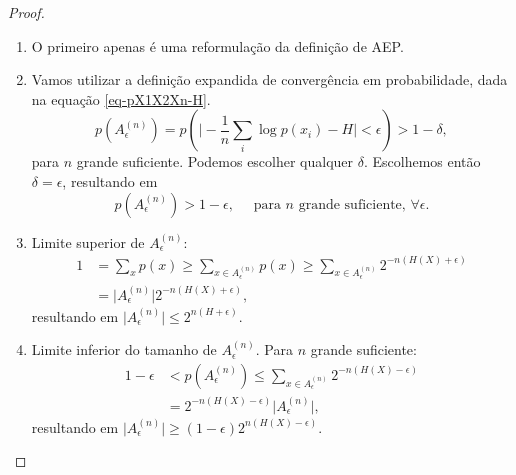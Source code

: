 \begin{proof}
\ \\
\begin{enumerate}
  \item O primeiro apenas é uma reformulação da definição de AEP.
  \item Vamos utilizar a definição expandida de convergência em probabilidade,
          dada na equação \ref{eq-pX1X2Xn-H}.
          \begin{equation}
          p(A_\epsilon^{(n)}) = p\left( \vert - \frac{1}{n} \sum_i \log p(x_i) - H \vert < \epsilon \right) > 1 - \delta ,
          \end{equation}
          para $n$ grande suficiente.
          Podemos escolher qualquer $\delta$. Escolhemos então $\delta = \epsilon$, resultando em
          \begin{equation}
          p(A_\epsilon^{(n)}) > 1 - \epsilon, \quad \text{ para } n \text{ grande suficiente, } \forall \epsilon .
          \end{equation}
  \item Limite superior de $A_\epsilon^{(n)}$:
    \begin{subequations}
      \begin{align}
        1 &= \sum_x p(x) \geq \sum_{x \in A_\epsilon^{(n)}} p(x) \geq \sum_{x \in A_\epsilon^{(n)}} 2^{-n(H(X)+\epsilon)} \\
          &= \vert A_\epsilon^{(n)} \vert 2^{-n(H(X)+\epsilon)},
      \end{align}
    \end{subequations}
  resultando em $\vert A_\epsilon^{(n)} \vert \leq 2^{n(H+\epsilon)}$.
  \item Limite inferior do tamanho de $A_\epsilon^{(n)}$. Para $n$ grande suficiente:
    \begin{subequations}
        \begin{align}
        1 - \epsilon &< p(A_\epsilon^{(n)}) \leq \sum_{x \in A_\epsilon^{(n)}} 2^{-n(H(X)-\epsilon)} \\
                     &= 2^{-n(H(X)-\epsilon)} \vert A_\epsilon^{(n)} \vert ,
        \end{align}
    \end{subequations}
    resultando em $\vert A_\epsilon^{(n)} \vert \geq (1-\epsilon) 2^{n(H(X)-\epsilon)}$.
\end{enumerate}
\end{proof}

